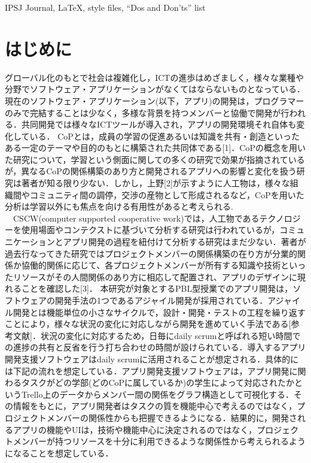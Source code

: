 \documentclass[submit]{ipsj}
\begin{document}
\begin{ekeyword}
IPSJ Journal, \LaTeX, style files, ``Dos and Don'ts'' list
\end{ekeyword}

\maketitle

\section{はじめに}

グローバル化のもとで社会は複雑化し，ICTの進歩はめざましく，様々な業種や分野でソフトウェア・アプリケーションがなくてはならないものとなっている．現在のソフトウェア・アプリケーション(以下，アプリ)の開発は，プログラマーのみで完結することは少なく，多様な背景を持つメンバーと協働で開発が行われる．共同開発では様々なICTツールが導入され，アプリの開発環境それ自体も変化している．
CoPとは，成員の学習の促進あるいは知識を共有・創造といったある一定のテーマや目的のもとに構築された共同体である[1]．CoPの概念を用いた研究について，学習という側面に関しての多くの研究で効果が指摘されているが，異なるCoPの関係構築のあり方と開発されるアプリへの影響と変化を扱う研究は著者が知る限り少ない．しかし，上野[2]が示すように人工物は，様々な組織間やコミュニティ間の調停，交渉の産物として形成されるなど，CoPを用いた分析は学習以外にも焦点を向ける有用性があると考えられる.
　CSCW(computer supported cooperative work)では，人工物であるテクノロジーを使用場面やコンテクストに基づいて分析する研究は行われているが，コミュニケーションとアプリ開発の過程を紐付けて分析する研究はまだ少ない．著者が過去行なってきた研究ではプロジェクトメンバーの関係構築の在り方が分業的関係か協働的関係に応じて、各プロジェクトメンバーが所有する知識や技術といったリソースがその人間関係のあり方に相応して配置され、アプリのデザインに現れることを確認した[3]．
本研究が対象とするPBL型授業でのアプリ開発は，ソフトウェアの開発手法の1つであるアジャイル開発が採用されている．アジャイル開発とは機能単位の小さなサイクルで，設計・開発・テストの工程を繰り返すことにより，様々な状況の変化に対応しながら開発を進めていく手法である[参考文献]．状況の変化に対応するため，日毎にdaily scrumと呼ばれる短い時間での進捗の共有と反省を行う打ち合わせの時間が設けられている．導入するアプリ開発支援ソフトウェアはdaily scrumに活用されることが想定される．具体的には下記の流れを想定している．アプリ開発支援ソフトウェアは，アプリ開発に関わるタスクがどの学部(どのCoPに属しているか)の学生によって対応されたかというTrello上のデータからメンバー間の関係をグラフ構造として可視化する．その情報をもとに，アプリ開発者はタスクの質を機能中心で考えるのではなく，プロジェクトメンバーの関係性からも把握できるようになる．結果的に，開発されるアプリの機能やUIは，技術や機能中心に決定されるのではなく，プロジェクトメンバーが持つリソースを十分に利用できるような関係性から考えられるようになることを想定している．
\end{document}
